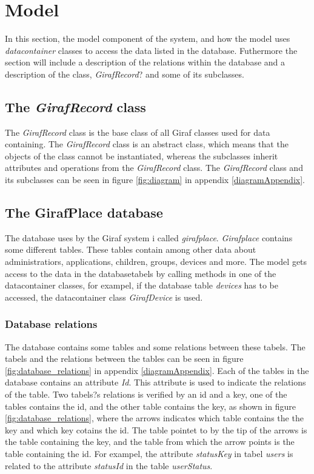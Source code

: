 \section{Model}
\label{model}

In this section, the model component of the system, and how the model uses \textit{datacontainer} classes to access the data listed in the database. Futhermore the section will include a description of the relations within the database and a description of the class, \textit{GirafRecord}? and some of its subclasses.

\subsection{The \textit{GirafRecord} class}
The \textit{GirafRecord} class is the base class of all Giraf classes used for data containing. The \textit{GirafRecord} class is an abstract class, which means that the objects of the class cannot be instantiated, whereas the subclasses inherit attributes and operations from the \textit{GirafRecord} class. The \textit{GirafRecord} class and its subclasses can be seen in figure \ref{fig:diagram} in appendix \ref{diagramAppendix}.

\subsection{The GirafPlace database}
The database uses by the Giraf system i called \textit{girafplace}. \textit{Girafplace} contains some different tables. These tables contain among other data about administratiors, applications, children, groups, devices and more.
The model gets access to the data in the databasetabels by calling methods in one of the datacontainer classes, for exampel, if the database table \textit{devices} has to be accessed, the datacontainer class \textit{GirafDevice} is used.

\subsubsection{Database relations}
The database contains some tables and some relations between these tabels. The tabels and the relations between the tables can be seen in figure \ref{fig:database_relations} in appendix \ref{diagramAppendix}.
Each of the tables in the database contains an attribute \textit{Id}. This attribute is used to indicate the relations of the table. Two tabels?s relations is verified by an id and a key, one of the tables contains the id, and the other table contains the key, as shown in figure \ref{fig:database_relations}, where the arrows indicates which table contains the the key and which key cotains the id. The table pointet to by the tip of the arrows is the table containing the key, and the table from which the arrow points is the table containing the id. 
For exampel, the attribute  \textit{statusKey} in tabel \textit{users} is related to the attribute \textit{statusId} in the table \textit{userStatus}.
